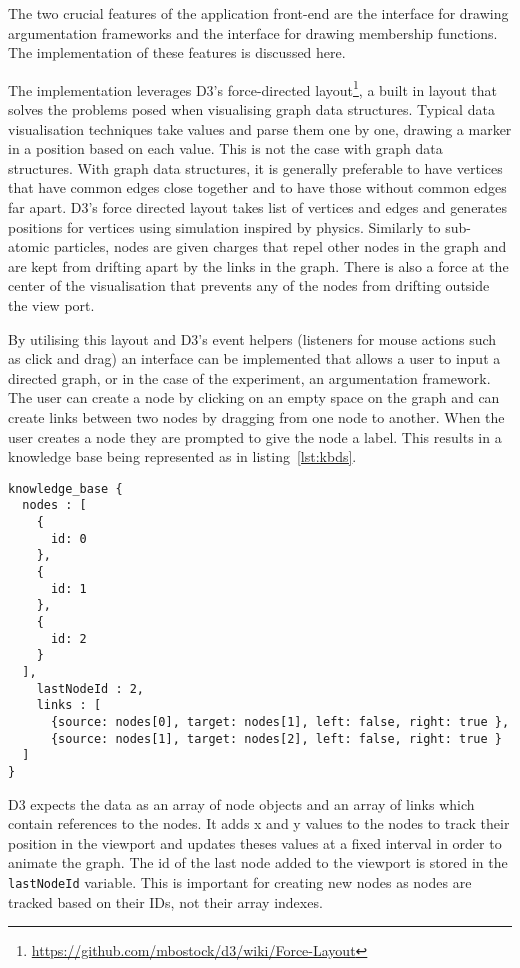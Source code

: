 The two crucial features of the application front-end are the interface for drawing argumentation frameworks and the interface for drawing membership functions. The implementation of these features is discussed here.

The implementation leverages D3's force-directed layout\footnote{\url{https://github.com/mbostock/d3/wiki/Force-Layout}}, a built in layout that solves the problems posed when visualising graph data structures. Typical data visualisation techniques take values and parse them one by one, drawing a marker in a position based on each value. This is not the case with graph data structures. With graph data structures, it is generally preferable to have vertices that have common edges close together and to have those without common edges far apart. D3's force directed layout takes list of vertices and edges and generates positions for vertices using simulation inspired by physics. Similarly to sub-atomic particles, nodes are given charges that repel other nodes in the graph and are kept from drifting apart by the links in the graph. There is also a force at the center of the visualisation that prevents any of the nodes from drifting outside the view port. 

By utilising this layout and D3's event helpers (listeners for mouse actions such as click and drag) an interface can be implemented that allows a user to input a directed graph, or in the case of the experiment, an argumentation framework. The user can create a node by clicking on an empty space on the graph and can create links between two nodes by dragging from one node to another. When the user creates a node they are prompted to give the node a label. This results in a knowledge base being represented as in listing~\ref{lst:kbds}.


\begin{lstlisting}[caption={JSON data structure for argumentation framework},label={lst:kbds}]
knowledge_base {
  nodes : [
    {
      id: 0
    },
    {
      id: 1
    },
    {
      id: 2
    }
  ],
    lastNodeId : 2,
    links : [
      {source: nodes[0], target: nodes[1], left: false, right: true },
      {source: nodes[1], target: nodes[2], left: false, right: true }
  ]
}
\end{lstlisting}

D3 expects the data as an array of node objects and an array of links which contain references to the nodes. It adds x and y values to the nodes to track their position in the viewport and updates theses values at a fixed interval in order to animate the graph. The id of the last node added to the viewport is stored in the \lstinline{lastNodeId} variable. This is important for creating new nodes as nodes are tracked based on their IDs, not their array indexes. 

